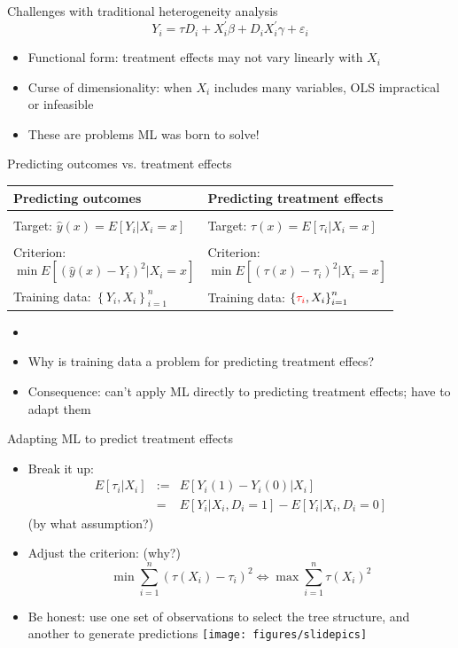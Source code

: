 \documentclass{beamer}
\newenvironment{stepitemize}{\begin{itemize}[<+->]}{\end{itemize} }
\begin{document}
\begin{frame}{Challenges with traditional heterogeneity analysis}
\[
Y_{i} =\tau D_{i}+X_{i}^{\prime }\beta +D_{i}X_{i}^{\prime }\gamma
+\varepsilon _{i}
\]
\begin{itemize}
	\item Functional form: treatment effects may not vary linearly with $X_i$
	\item Curse of dimensionality: when $X_i$ includes many variables, OLS impractical or infeasible
	\item These are problems ML was born to solve!
\end{itemize}
\end{frame}

\begin{frame}{Predicting outcomes vs. treatment effects}
\begin{tabular}{p{2in}p{2in}}
Predicting outcomes & Predicting treatment effects \\ \hline
 & \\
Target: $\hat{y}\left(x\right) = E\left[Y_i|X_i=x\right]$ & Target: $\tau\left(x\right) = E\left[\tau_i|X_i=x\right]$\\ 
 & \\
Criterion: 
\[
\min E\left[\left(\hat{y}\left(x\right)-Y_i\right)^2|X_i=x\right] 
\]
& Criterion:
\[
\min E\left[\left(\tau\left(x\right)-\tau_i\right)^2|X_i=x\right] 
\]
\\
Training data: $\left\{Y_i,X_i\right\}_{i=1}^n$  & Training data: $\left\{{\color{red}\tau_i},X_i\right\}_{i=1}^n$ \\
\end{tabular}
\begin{stepitemize}
\item[]
\item[] Why is training data a problem for predicting treatment effecs?
\item Consequence: can't apply ML directly to predicting treatment effects; have to adapt them
\end{stepitemize}
\end{frame}

\begin{frame}{Adapting ML to predict treatment effects}
\begin{stepitemize}
	\item Break it up:
	\begin{eqnarray*}
	E\left[ \tau _{i}|X_{i}\right]  &:=&E\left[ Y_{i}\left( 1\right)
	-Y_{i}\left( 0\right) |X_{i}\right]  \\
	&=&E\left[ Y_{i}|X_{i},D_{i}=1\right] -E\left[ Y_{i}|X_{i},D_{i}=0\right] 
	\end{eqnarray*}
	(by what assumption?)
	\item Adjust the criterion: (why?)
	\[
		\min \sum_{i=1}^n\left(\tau\left(X_i\right)-\tau_i\right)^2 \iff \max \sum_{i=1}^n\tau\left(X_i\right)^2
	\]
	\item Be honest: use one set of observations to select the tree structure, and another to generate predictions
	\texttt{[image: figures/slidepics]}
\end{stepitemize}
\end{frame}
\end{document}
